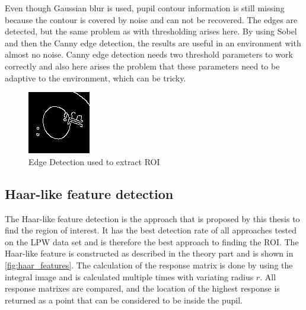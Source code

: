 Even though Gaussian blur is used, pupil contour information is still missing because the contour is covered by noise and can not be recovered. The edges are detected, but the same problem as with thresholding arises here. By using Sobel and then the Canny edge detection, the results are useful in an environment with almost no noise. Canny edge detection needs two threshold parameters to work correctly and also here arises the problem that these parameters need to be adaptive to the environment, which can be tricky. 
\begin{figure}[h]
    \centering
        \includegraphics[width=0.3\linewidth]{plots/edge_detection.png}
    \caption{Edge Detection used to extract ROI}
    \label{fig:edge_roi}
\end{figure}

\subsection{Haar-like feature detection}
The Haar-like feature detection is the approach that is proposed by this thesis to find the region of interest. It has the best detection rate of all approaches tested on the LPW data set and is therefore the best approach to finding the ROI. The Haar-like feature is constructed as described in the theory part and is shown in \ref{fig:haar_features}. 
The calculation of the response matrix is done by using the integral image and is calculated multiple times with variating radius $r$. All response matrixes are compared, and the location of the highest response is returned as a point that can be considered to be inside the pupil. 

